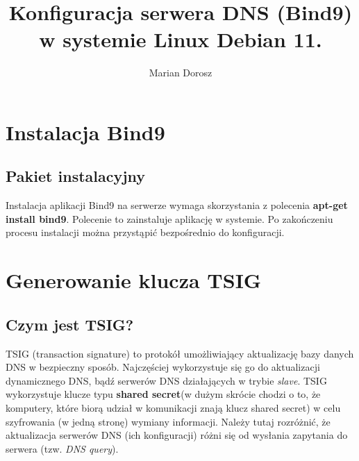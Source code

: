 \documentclass[12pt, a4paper]{article}
\title{Konfiguracja serwera DNS (Bind9) w systemie Linux Debian 11.}
\author{Marian Dorosz}
\date{}
\begin{document}
\maketitle
\newpage

\tableofcontents
\newpage

\listoffigures
\newpage

\section{Instalacja Bind9}
    \subsection{Pakiet instalacyjny}
        Instalacja aplikacji Bind9 na serwerze wymaga skorzystania z polecenia \textbf{apt-get install bind9}. Polecenie to zainstaluje aplikację w systemie. Po zakończeniu procesu instalacji można przystąpić bezpośrednio do konfiguracji.

\section{Generowanie klucza TSIG}

    \subsection{Czym jest TSIG?}
        TSIG (transaction signature) to protokół umożliwiający aktualizację bazy danych DNS w bezpieczny sposób. Najczęściej wykorzystuje się go do aktualizacji dynamicznego DNS, bądź serwerów DNS działających w trybie \textit{slave}. TSIG wykorzystuje klucze typu \textbf{shared secret}(w dużym skrócie chodzi o to, że komputery, które biorą udział w komunikacji znają klucz shared secret) w celu szyfrowania (w jedną stronę) wymiany informacji. Należy tutaj rozróżnić, że aktualizacja serwerów DNS (ich konfiguracji) różni się od wysłania zapytania do serwera (tzw. \textit{DNS query}).
        
\end{document}

